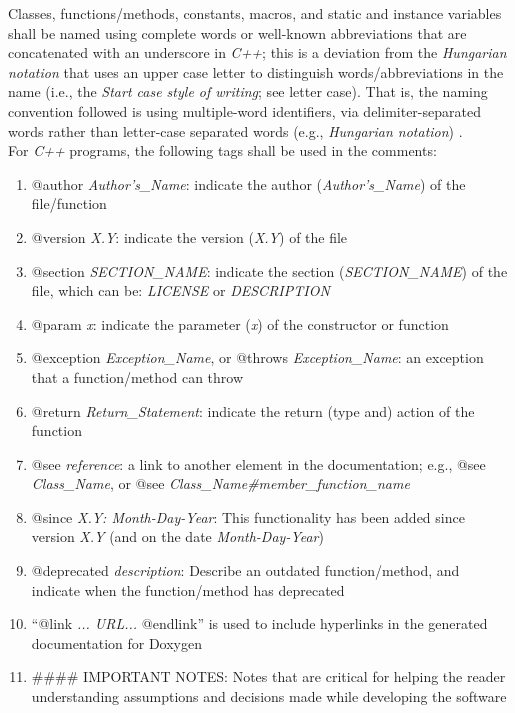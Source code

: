 \documentclass[letter,12pt]{article}
\begin{document}
Classes, functions/methods, constants, macros, and static and instance variables shall be named using complete words or well-known abbreviations that are concatenated with an underscore in {\it C++}; this is a deviation from the {\it Hungarian notation} that uses an upper case letter to distinguish words/abbreviations in the name (i.e., the {\it Start case style of writing}; see letter case). That is, the naming convention followed is using multiple-word identifiers, via delimiter-separated words rather than letter-case separated words (e.g., {\it Hungarian notation}) \cite{WikipediaContributors2017}. \\

For {\it C++} programs, the following tags shall be used in the comments: \vspace{-0.3cm}
\begin{enumerate} \itemsep -4pt
\item @author {\it Author's\_Name}: indicate the author ({\it Author's\_Name}) of the file/function
\item @version {\it X.Y}: indicate the version ({\it X.Y}) of the file
\item @section {\it SECTION\_NAME}: indicate the section ({\it SECTION\_NAME}) of the file, which can be: {\it LICENSE} or {\it DESCRIPTION}
\item @param {\it x}: indicate the parameter ({\it x}) of the constructor or function
\item @exception {\it Exception\_Name}, or @throws {\it Exception\_Name}: an exception that a function/method can throw
\item @return {\it Return\_Statement}: indicate the return (type and) action of the function
\item @see {\it reference}: a link to another element in the documentation; e.g., @see {\it Class\_Name}, or @see {\it Class\_Name\#member\_function\_name}
\item @since {\it X.Y: Month-Day-Year}: This functionality has been added since version {\it X.Y} (and on the date {\it Month-Day-Year})
\item @deprecated {\it description}: Describe an outdated function/method, and indicate when the function/method has deprecated
\item ``@link {\it ... URL...} @endlink'' is used to include hyperlinks in the generated documentation for Doxygen
\item \#\#\#\# IMPORTANT NOTES: Notes that are critical for helping the reader understanding assumptions and decisions made while developing the software

\end{enumerate}
\end{document}
